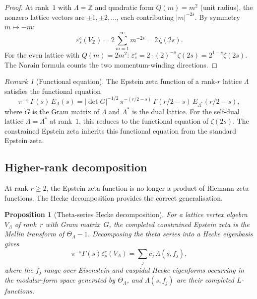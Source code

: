 \documentclass[11pt,reqno]{amsart}
\newtheorem{proposition}[theorem]{Proposition}
\theoremstyle{definition}
\theoremstyle{remark}
\newtheorem{remark}[theorem]{Remark}
\providecommand{\bZ}{\mathbb{Z}}
\numberwithin{equation}{section}
\begin{document}
\begin{proof}
  At rank~$1$ with $\Lambda = \bZ$ and quadratic form
  $Q(m) = m^2$ (unit radius), the nonzero lattice vectors are
  $\pm 1, \pm 2, \ldots$, each contributing $|m|^{-2s}$. By
  symmetry $m \mapsto -m$:
  \[
    \varepsilon^c_s(V_\bZ)
    = 2 \sum_{m=1}^\infty m^{-2s}
    = 2\,\zeta(2s).
  \]
  For the even lattice with $Q(m) = 2m^2$:
  $\varepsilon^c_s = 2 \cdot (2)^{-s}\,\zeta(2s) =
  2^{1-s}\zeta(2s)$. The Narain formula counts the two
  momentum-winding directions.
\end{proof}

\begin{remark}[Functional equation]\label{rem:epstein-fe}
  The Epstein zeta function of a rank-$r$ lattice $\Lambda$ satisfies
  the functional equation
  \[
    \pi^{-s}\,\Gamma(s)\,E_\Lambda(s)
    = |\det G|^{-1/2}\,
    \pi^{-(r/2-s)}\,\Gamma(r/2-s)\,E_{\Lambda^*}(r/2-s),
  \]
  where $G$ is the Gram matrix of $\Lambda$ and $\Lambda^*$ is the
  dual lattice. For the self-dual lattice $\Lambda = \Lambda^*$ at
  rank~$1$, this reduces to the functional equation of
  $\zeta(2s)$. The constrained Epstein zeta inherits this functional
  equation from the standard Epstein zeta.
\end{remark}

\subsection{Higher-rank decomposition}

At rank $r \ge 2$, the Epstein zeta function is no longer a product
of Riemann zeta functions. The Hecke decomposition provides the
correct generalisation.

\begin{proposition}[Theta-series Hecke decomposition]
  \label{prop:hecke-decomposition}
  For a lattice vertex algebra $V_\Lambda$ of rank~$r$ with
  Gram matrix~$G$, the completed constrained Epstein zeta is the
  Mellin transform of $\Theta_\Lambda-1$. Decomposing the theta
  series into a Hecke eigenbasis gives
  \begin{equation}\label{eq:hecke-decomp}
    \pi^{-s}\Gamma(s)\varepsilon^c_s(V_\Lambda)
    = \sum_j c_j\,\Lambda(s,f_j),
  \end{equation}
  where the $f_j$ range over Eisenstein and cuspidal Hecke
  eigenforms occurring in the modular-form space generated by
  $\Theta_\Lambda$, and $\Lambda(s,f_j)$ are their completed
  $L$-functions.
\end{proposition}
\end{document}
